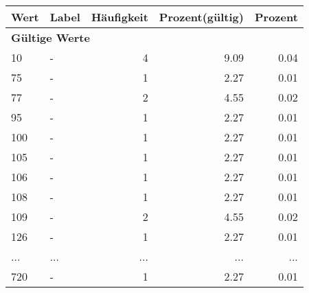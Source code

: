      \begin{longtable}{lXrrr}
     \toprule
     \textbf{Wert} & \textbf{Label} & \textbf{Häufigkeit} & \textbf{Prozent(gültig)} & \textbf{Prozent} \\
     \endhead
     \midrule
     \multicolumn{5}{l}{\textbf{Gültige Werte}}\\
        10 & \multicolumn{1}{X}{-} & %
          \num{4} &
          \num[round-mode=places,round-precision=2]{9,09} &
          \num[round-mode=places,round-precision=2]{0,04} \\
        75 & \multicolumn{1}{X}{-} & %
          \num{1} &
          \num[round-mode=places,round-precision=2]{2,27} &
          \num[round-mode=places,round-precision=2]{0,01} \\
        77 & \multicolumn{1}{X}{-} & %
          \num{2} &
          \num[round-mode=places,round-precision=2]{4,55} &
          \num[round-mode=places,round-precision=2]{0,02} \\
        95 & \multicolumn{1}{X}{-} & %
          \num{1} &
          \num[round-mode=places,round-precision=2]{2,27} &
          \num[round-mode=places,round-precision=2]{0,01} \\
        100 & \multicolumn{1}{X}{-} & %
          \num{1} &
          \num[round-mode=places,round-precision=2]{2,27} &
          \num[round-mode=places,round-precision=2]{0,01} \\
        105 & \multicolumn{1}{X}{-} & %
          \num{1} &
          \num[round-mode=places,round-precision=2]{2,27} &
          \num[round-mode=places,round-precision=2]{0,01} \\
        106 & \multicolumn{1}{X}{-} & %
          \num{1} &
          \num[round-mode=places,round-precision=2]{2,27} &
          \num[round-mode=places,round-precision=2]{0,01} \\
        108 & \multicolumn{1}{X}{-} & %
          \num{1} &
          \num[round-mode=places,round-precision=2]{2,27} &
          \num[round-mode=places,round-precision=2]{0,01} \\
        109 & \multicolumn{1}{X}{-} & %
          \num{2} &
          \num[round-mode=places,round-precision=2]{4,55} &
          \num[round-mode=places,round-precision=2]{0,02} \\
        126 & \multicolumn{1}{X}{-} & %
          \num{1} &
          \num[round-mode=places,round-precision=2]{2,27} &
          \num[round-mode=places,round-precision=2]{0,01} \\
       ... & ... & ... & ... & ... \\
        720 & \multicolumn{1}{X}{-} & %
          \num{1} &
          \num[round-mode=places,round-precision=2]{2,27} &
          \num[round-mode=places,round-precision=2]{0,01} \\


\end{longtable}
